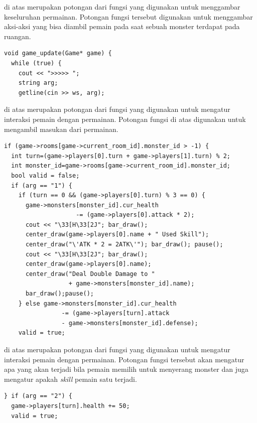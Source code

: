 \documentclass[../main.tex]{subfiles}
\begin{document}
{\Script} di atas merupakan potongan dari fungsi  yang digunakan untuk menggambar keseluruhan permainan. Potongan fungsi tersebut digunakan untuk menggambar aksi-aksi yang bisa diambil pemain pada saat sebuah monster terdapat pada ruangan.

\begin{code}
\begin{verbatim}
void game_update(Game* game) {
  while (true) {
    cout << ">>>>> ";
    string arg;
    getline(cin >> ws, arg);
\end{verbatim}
\end{code}

{\Script} di atas merupakan potongan dari fungsi  yang digunakan untuk mengatur interaksi pemain dengan permainan. Potongan fungsi di atas digunakan untuk mengambil masukan dari permainan.

\begin{code}
\begin{verbatim}
if (game->rooms[game->current_room_id].monster_id > -1) {
  int turn=(game->players[0].turn + game->players[1].turn) % 2;
  int monster_id=game->rooms[game->current_room_id].monster_id;
  bool valid = false;
  if (arg == "1") {
    if (turn == 0 && (game->players[0].turn) % 3 == 0) {
      game->monsters[monster_id].cur_health
                    -= (game->players[0].attack * 2);
      cout << "\33[H\33[2J"; bar_draw();
      center_draw(game->players[0].name + " Used Skill");
      center_draw("\'ATK * 2 = 2ATK\'"); bar_draw(); pause();
      cout << "\33[H\33[2J"; bar_draw();
      center_draw(game->players[0].name);
      center_draw("Deal Double Damage to "
                  + game->monsters[monster_id].name);
      bar_draw();pause();
    } else game->monsters[monster_id].cur_health
                -= (game->players[turn].attack
                - game->monsters[monster_id].defense);
    valid = true;
\end{verbatim}
\end{code}

{\Script} di atas merupakan potongan dari fungsi  yang digunakan untuk mengatur interaksi pemain dengan permainan. Potongan fungsi tersebut akan mengatur apa yang akan terjadi bila pemain memilih untuk menyerang monster dan juga mengatur apakah \textit{skill} pemain satu terjadi.

\begin{code}
\begin{verbatim}
} if (arg == "2") {
  game->players[turn].health += 50;
  valid = true;
\end{verbatim}
\end{code}
\end{document}
